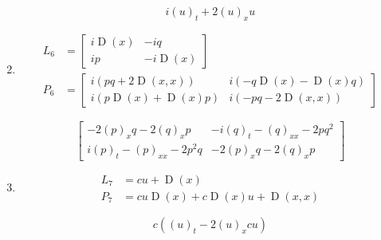 \documentclass{article}
\begin{document}
\begin{enumerate}
                \begin{equation}
                i (u)_{t} + 2 (u)_{x} u
                \end{equation}
            
                \item
                \begin{align}
                L_{6} &= \left[\begin{matrix}i \operatorname{D}\left(x\right) & - i q\\i p & - i \operatorname{D}\left(x\right)\end{matrix}\right] \\
                P_{6} &= \left[\begin{matrix}i \left(p q + 2 \operatorname{D}\left(x, x\right)\right) & i \left(- q \operatorname{D}\left(x\right) - \operatorname{D}\left(x\right) q\right)\\i \left(p \operatorname{D}\left(x\right) + \operatorname{D}\left(x\right) p\right) & i \left(- p q - 2 \operatorname{D}\left(x, x\right)\right)\end{matrix}\right]
                \end{align}
                
                \begin{equation}
                \left[\begin{matrix}- 2 (p)_{x} q - 2 (q)_{x} p & - i (q)_{t} - (q)_{xx} - 2 p q^{2}\\i (p)_{t} - (p)_{xx} - 2 p^{2} q & - 2 (p)_{x} q - 2 (q)_{x} p\end{matrix}\right]
                \end{equation}
            
                \item
                \begin{align}
                L_{7} &= c u + \operatorname{D}\left(x\right) \\
                P_{7} &= c u \operatorname{D}\left(x\right) + c \operatorname{D}\left(x\right) u + \operatorname{D}\left(x, x\right)
                \end{align}
                
                \begin{equation}
                c \left((u)_{t} - 2 (u)_{x} c u\right)
                \end{equation}
            

\end{enumerate}
\end{document}
